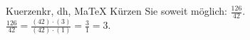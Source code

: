 \begin{MAufgabe}{Kuerzen}{kr, dh, MaTeX}
K\"urzen Sie soweit m\"oglich: $\frac{126}{42}$.\\ 
\ifLsg\MLoesung
\quad $\frac{126}{42}=\frac{(42)\cdot(3)}{(42)\cdot(1)}=\frac{3}{1}=3$.\else\relax\fi
 \end{MAufgabe}